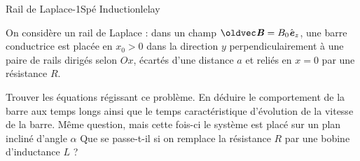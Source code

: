\begin{exercise}{Rail de Laplace}{-1}{Spé}
{Induction}{lelay}

On considère un rail de Laplace : dans un champ $\vec{B} = B_0\ve_z$, une barre conductrice est placée en $x_0 > 0$ dans la direction $y$ perpendiculairement à une paire de rails dirigés selon $Ox$, écartés d'une distance $a$ et reliés en $x = 0$ par une résistance $R$.

\begin{questions}
    \question Trouver les équations régissant ce problème. En déduire le comportement de la barre aux temps longs ainsi que le temps caractéristique d'évolution de la vitesse de la barre.
    \question Même question, mais cette fois-ci le système est placé sur un plan incliné d'angle $\alpha$
    \question Que se passe-t-il si on remplace la résistance $R$ par une bobine d'inductance $L$ ?
\end{questions}

\end{exercise}